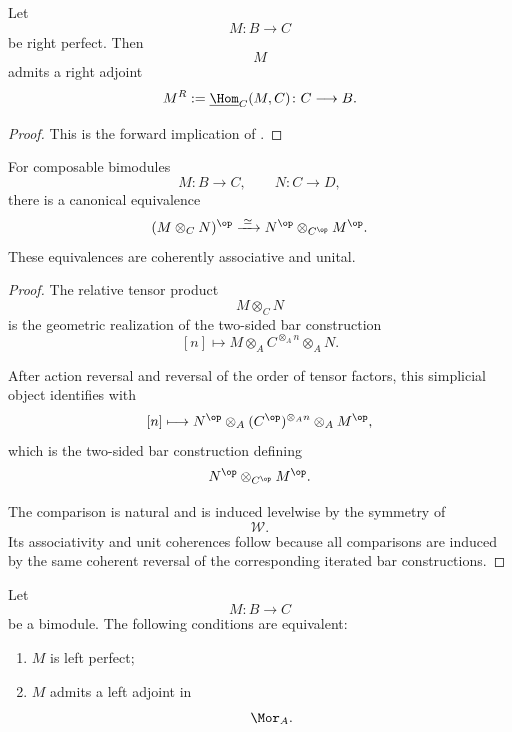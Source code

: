 \begin{corollary}
\label{cor:right-morita-adjoint}
Let
\[
    M
    \colon
    B
    \longrightarrow
    C
\]
be right perfect. Then
\[
    M
\]
admits a right adjoint
\[
    M^R
    :=
    \underline{\Hom}_C(M,C)
    \colon
    C
    \longrightarrow
    B.
\]
\end{corollary}

\begin{proof}
This is the forward implication of
.
\end{proof}

\begin{proposition}
\label{prop:op-reversal-morita-composition}
For composable bimodules
\[
    M
    \colon
    B
    \longrightarrow
    C,
    \qquad
    N
    \colon
    C
    \longrightarrow
    D,
\]
there is a canonical equivalence
\[
    (M\otimes_C N)^{\op}
    \xrightarrow{\;\simeq\;}
    N^{\op}
    \otimes_{C^{\op}}
    M^{\op}.
\]
These equivalences are coherently associative and unital.
\end{proposition}

\begin{proof}
The relative tensor product
\[
    M\otimes_C N
\]
is the geometric realization of the two-sided bar construction
\[
    [n]
    \longmapsto
    M
    \otimes_A
    C^{\otimes_A n}
    \otimes_A
    N.
\]

After action reversal and reversal of the order of tensor factors, this
simplicial object identifies with
\[
    [n]
    \longmapsto
    N^{\op}
    \otimes_A
    (C^{\op})^{\otimes_A n}
    \otimes_A
    M^{\op},
\]
which is the two-sided bar construction defining
\[
    N^{\op}
    \otimes_{C^{\op}}
    M^{\op}.
\]

The comparison is natural and is induced levelwise by the symmetry of
\[
    \mathcal W.
\]
Its associativity and unit coherences follow because all comparisons are
induced by the same coherent reversal of the corresponding iterated bar
constructions.
\end{proof}

\begin{corollary}
\label{cor:left-perfect-morita-adjointability}
Let
\[
    M
    \colon
    B
    \longrightarrow
    C
\]
be a bimodule. The following conditions are equivalent:
\begin{enumerate}[label=(\roman*)]
    \item $M$ is left perfect;

    \item $M$ admits a left adjoint in
    \[
        \Mor_A.
    \]
\end{enumerate}
\end{corollary}


